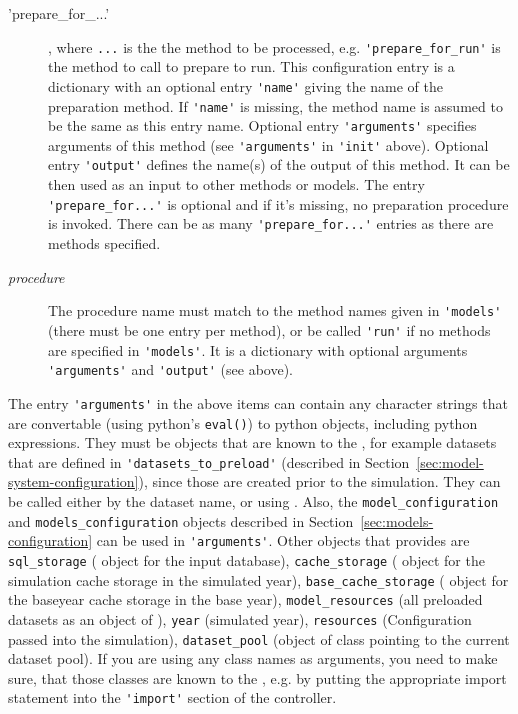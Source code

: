 \begin{description}
\item['prepare_for_...'], where \verb|...| is the the method
to be processed, e.g. \verb|'prepare_for_run'| is the method to call to prepare
to run. This configuration entry is a dictionary with an
optional entry \verb|'name'| giving the name of the preparation method. If \verb|'name'| is
missing, the method name is assumed to be the same as this entry name. Optional
entry \verb|'arguments'| specifies arguments of this method (see \verb|'arguments'| in \verb|'init'|
above). Optional entry \verb|'output'| defines the name(s) of the output of this
method.  It can be then used as an input to other methods or models. The entry
\verb|'prepare_for...'| is optional and if it's missing, no preparation procedure is
invoked. There can be as many \verb|'prepare_for...'| entries as there are
methods specified.
\item[{\it procedure}] The procedure name must match to the method names given
in \verb|'models'| (there must be one entry per method), or be called \verb|'run'| if no
methods are specified in \verb|'models'|. It is a dictionary with optional arguments
\verb|'arguments'| and \verb|'output'| (see above).
\end{description}

The entry \verb|'arguments'| in the above items can contain any character
strings that are convertable (using python's \verb|eval()|) to python \pythonindex objects,
including python \pythonindex expressions. They must be objects that are known to the
, for example datasets \datasetindex that are defined in
\verb|'datasets_to_preload'| (described in
Section~\ref{sec:model-system-configuration}), since those are created prior to
the simulation. They can be called either by the dataset \datasetindex name, or using
. Also, the \verb|model_configuration| and
\verb|models_configuration| objects described in
Section~\ref{sec:models-configuration} can be used in \verb|'arguments'|. Other
objects that  provides are \verb|sql_storage|
( object for the input database), \verb|cache_storage|
( object for the simulation cache \simulationcacheindex storage
in the simulated year), \verb|base_cache_storage| \baseyearcacheindex ( object for
the baseyear cache \baseyearcacheindex storage in the base year),
\verb|model_resources| (all preloaded datasets as an object of
), \verb|year| (simulated year), \verb|resources|
(Configuration passed into the simulation), \verb|dataset_pool| (object of class  pointing to the current
dataset pool).  If you are using any class names
as arguments, you need to make sure, that those classes are known to the
, e.g. by putting the appropriate import statement into the
\verb|'import'| section of the controller.

